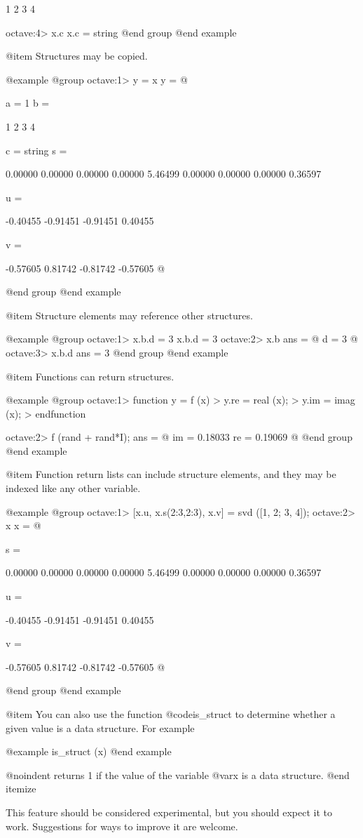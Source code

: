   1  2
  3  4

octave:4> x.c
x.c = string
@end group
@end example

@item Structures may be copied.

@example
@group
octave:1> y = x
y =
@{
  a = 1
  b =

    1  2
    3  4

  c = string
  s =

    0.00000  0.00000  0.00000
    0.00000  5.46499  0.00000
    0.00000  0.00000  0.36597

  u =

    -0.40455  -0.91451
    -0.91451   0.40455

  v =

    -0.57605   0.81742
    -0.81742  -0.57605
@}
@end group
@end example

@item Structure elements may reference other structures.

@example
@group
octave:1> x.b.d = 3
x.b.d = 3
octave:2> x.b
ans =
@{
  d = 3
@}
octave:3> x.b.d
ans = 3
@end group
@end example

@item Functions can return structures.

@example
@group
octave:1> function y = f (x)
> y.re = real (x);
> y.im = imag (x);
> endfunction

octave:2> f (rand + rand*I);
ans =
@{
  im = 0.18033
  re = 0.19069
@}
@end group
@end example

@item Function return lists can include structure elements, and they may
be indexed like any other variable.

@example
@group
octave:1> [x.u, x.s(2:3,2:3), x.v] = svd ([1, 2; 3, 4]);
octave:2> x
x =
@{
  s =

    0.00000  0.00000  0.00000
    0.00000  5.46499  0.00000
    0.00000  0.00000  0.36597

  u =

    -0.40455  -0.91451
    -0.91451   0.40455

  v =

    -0.57605   0.81742
    -0.81742  -0.57605
@}
@end group
@end example

@item You can also use the function @code{is_struct} to determine
whether a given value is a data structure.  For example

@example
is_struct (x)
@end example

@noindent
returns 1 if the value of the variable @var{x} is a data structure.
@end itemize

This feature should be considered experimental, but you should expect it
to work.  Suggestions for ways to improve it are welcome.

